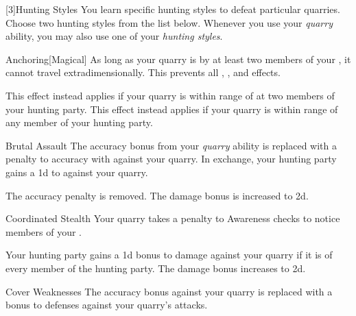         [3]{Hunting Styles}
        You learn specific hunting styles to defeat particular quarries.
        Choose two hunting styles from the list below.
        Whenever you use your \textit{quarry} ability, you may also use one of your \textit{hunting styles}.
        {
            \begin{ability}{Anchoring}[Magical]
                As long as your quarry is  by at least two members of your , it cannot travel extradimensionally.
                This prevents all , , and  effects.

                \rankline
                 This effect instead applies if your quarry is within \rngmed range of at two members of your hunting party.
                 This effect instead applies if your quarry is within \rnglong range of any member of your hunting party.
            \end{ability}

            \begin{ability}{Brutal Assault}
                The accuracy bonus from your \textit{quarry} ability is replaced with a  penalty to accuracy with  against your quarry.
                In exchange, your hunting party gains a \plus1d  to  against your quarry.

                \rankline
                 The accuracy penalty is removed.
                 The damage bonus is increased to \plus2d.
            \end{ability}

            \begin{ability}{Coordinated Stealth}
                Your quarry takes a  penalty to Awareness checks to notice members of your .

                \rankline
                 Your hunting party gains a \plus1d bonus to damage against your quarry if it is \unaware of every member of the hunting party.
                 The damage bonus increases to \plus2d.
            \end{ability}

            \begin{ability}{Cover Weaknesses}
                The accuracy bonus against your quarry is replaced with a  bonus to defenses against your quarry's attacks.


\end{ability}}
